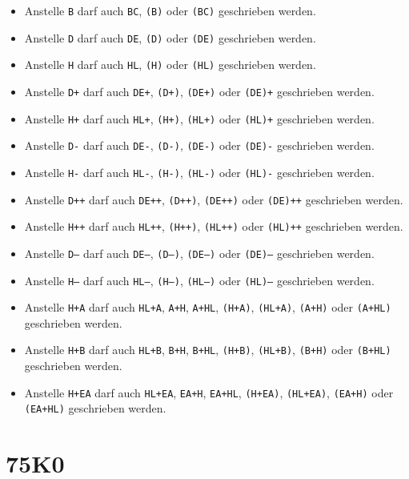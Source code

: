 \documentclass[12pt,a4paper,twoside]{report}
\newcommand{\tty}[1]{{\tt #1}}
\begin{document}
\begin{itemize}
\item{Anstelle \tty{B} darf auch \tty{BC}, \tty{(B)} oder
      \tty{(BC)} geschrieben werden.}
\item{Anstelle \tty{D} darf auch \tty{DE}, \tty{(D)} oder
      \tty{(DE)} geschrieben werden.}
\item{Anstelle \tty{H} darf auch \tty{HL}, \tty{(H)} oder
      \tty{(HL)} geschrieben werden.}
\item{Anstelle \tty{D+} darf auch \tty{DE+}, \tty{(D+)},
      \tty{(DE+)} oder \tty{(DE)+} geschrieben werden.}
\item{Anstelle \tty{H+} darf auch \tty{HL+}, \tty{(H+)},
      \tty{(HL+)} oder \tty{(HL)+} geschrieben werden.}
\item{Anstelle \tty{D-} darf auch \tty{DE-}, \tty{(D-)},
      \tty{(DE-)} oder \tty{(DE)-} geschrieben werden.}
\item{Anstelle \tty{H-} darf auch \tty{HL-}, \tty{(H-)},
      \tty{(HL-)} oder \tty{(HL)-} geschrieben werden.}
\item{Anstelle \tty{D++} darf auch \tty{DE++}, \tty{(D++)},
      \tty{(DE++)} oder \tty{(DE)++} geschrieben werden.}
\item{Anstelle \tty{H++} darf auch \tty{HL++}, \tty{(H++)},
      \tty{(HL++)} oder \tty{(HL)++} geschrieben werden.}
\item{Anstelle \tty{D--} darf auch \tty{DE--}, \tty{(D--)},
      \tty{(DE--)} oder \tty{(DE)--} geschrieben werden.}
\item{Anstelle \tty{H--} darf auch \tty{HL--}, \tty{(H--)},
      \tty{(HL--)} oder \tty{(HL)--} geschrieben werden.}
\item{Anstelle \tty{H+A} darf auch \tty{HL+A}, \tty{A+H},
      \tty{A+HL}, \tty{(H+A)}, \tty{(HL+A)}, \tty{(A+H)}
      oder \tty{(A+HL)} geschrieben werden.}
\item{Anstelle \tty{H+B} darf auch \tty{HL+B}, \tty{B+H},
      \tty{B+HL}, \tty{(H+B)}, \tty{(HL+B)}, \tty{(B+H)}
      oder \tty{(B+HL)} geschrieben werden.}
\item{Anstelle \tty{H+EA} darf auch \tty{HL+EA}, \tty{EA+H},
      \tty{EA+HL}, \tty{(H+EA)}, \tty{(HL+EA)}, \tty{(EA+H)}
      oder \tty{(EA+HL)} geschrieben werden.}
\end{itemize}


\section{75K0}
\label{75K0Spec}
\end{document}
